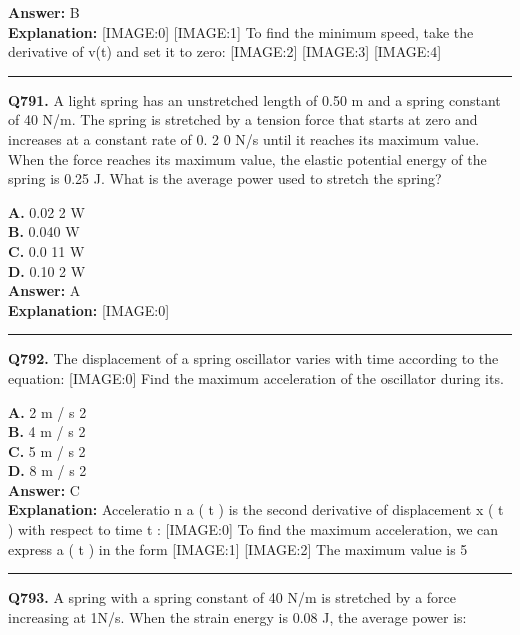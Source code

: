 \documentclass[12pt]{article}
\begin{document}
\textbf{Answer:} B \\
\textbf{Explanation:} [IMAGE:0]
[IMAGE:1]
To find the minimum speed, take the derivative of v(t) and set it to zero:
[IMAGE:2]
[IMAGE:3]
[IMAGE:4]

\hrule
\vspace{1em}


\noindent
\textbf{Q791.} A light spring has an unstretched length of 0.50 m and a spring constant of 40 N/m. The spring is stretched by a tension force that starts at zero and increases at a constant rate of 0.
2
0 N/s until it reaches its maximum value. When the force reaches its maximum value, the elastic potential energy of the spring is 0.25 J. What is the average power used to stretch the spring?



\textbf{A.} 0.02
2
W \\
\textbf{B.} 0.040 W \\
\textbf{C.} 0.0
11
W \\
\textbf{D.} 0.10
2
W \\

\textbf{Answer:} A \\
\textbf{Explanation:} [IMAGE:0]

\hrule
\vspace{1em}


\noindent
\textbf{Q792.} The displacement of a spring oscillator varies with time according to the equation:
[IMAGE:0]
Find the maximum acceleration of the oscillator during its.



\textbf{A.} 2
m
/
s
2 \\
\textbf{B.} 4
m
/
s
2 \\
\textbf{C.} 5
m
/
s
2 \\
\textbf{D.} 8
m
/
s
2 \\

\textbf{Answer:} C \\
\textbf{Explanation:} Acceleratio
n
a
(
t
) is the second derivative of displacement
x
(
t
) with respect to time
t
:
[IMAGE:0]
To find the maximum acceleration, we can express
a
(
t
) in the form
[IMAGE:1]
[IMAGE:2]
The maximum value is 5

\hrule
\vspace{1em}


\noindent
\textbf{Q793.} A spring with a spring constant of 40 N/m is stretched by a force increasing at 1N/s. When the strain energy is 0.08 J, the average power is:
\end{document}
